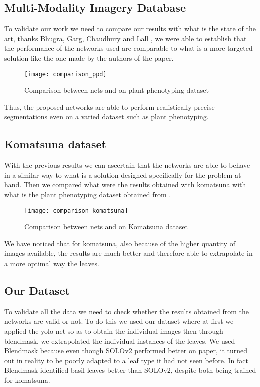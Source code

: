 \subsection{Multi-Modality Imagery Database}
To validate our work we need to compare our results with what is the state of the art, thanks Bhugra, Garg, Chaudhury and Lall \cite{9411981}, we were able to establish that
the performance of the networks used are comparable to what is a more targeted solution like the one made by the authors of the paper.

\begin{figure}[h]
  \centering
  \texttt{[image: comparison\_ppd]}%
  \caption{Comparison between nets and \cite{9411981} on plant phenotyping dataset}%
\end{figure}

Thus, the proposed networks are able to perform realistically precise segmentations even on a varied dataset such as plant phenotyping.

\subsection{Komatsuna dataset}
With the previous results we can ascertain that the networks are able to behave in a similar way to what is a solution designed specifically for the problem at hand.
Then we compared what were the results obtained with komatsuna with what is the plant phenotyping dataset obtained from \cite{9411981}. 

\begin{figure}[ht]
  \centering
  \texttt{[image: comparison\_komatsuna]}%
  \caption{Comparison between nets and \cite{9411981} on Komatsuna dataset}%
\end{figure}

We have noticed that for komatsuna, also because of the higher quantity of images available, the results are much better and therefore able to extrapolate in
a more optimal way the leaves.

\subsection{Our Dataset}
To validate all the data we need to check whether the results obtained from the networks are valid or not. To do this we used our dataset where at first we
applied the yolo-net so as to obtain the individual images then through blendmask, we extrapolated the individual instances of the leaves.
We used Blendmask because even though SOLOv2 performed better on paper, it turned out in reality to be poorly adapted to a leaf type it had not seen before.
In fact Blendmask identified basil leaves better than SOLOv2, despite both being trained for komatsuna.

